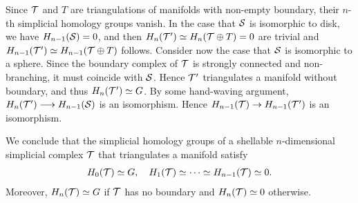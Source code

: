 \documentclass[a4paper]{amsart}
\begin{document}
\begin{remark}
    Since ${\mathcal T}$ and $T$ are triangulations of manifolds with non-empty boundary, their $n$-th simplicial homology groups vanish. 
    In the case that ${\mathcal S}$ is isomorphic to disk, we have $H_{n-1}({\mathcal S}) = 0$,
    and then $H_{n}({\mathcal T}') \simeq H_{n}({\mathcal T} \oplus T) = 0$ are trivial 
    and $H_{n-1}({\mathcal T}') \simeq H_{n-1}({\mathcal T} \oplus T)$ follows.
    Consider now the case that ${\mathcal S}$ is isomorphic to a sphere.
    Since the boundary complex of ${\mathcal T}$ is strongly connected and non-branching, it must coincide with ${\mathcal S}$. Hence ${\mathcal T}'$ triangulates a manifold without boundary, and thus $H_{n}({\mathcal T}') \simeq {G}$. 
    \color{red}By some hand-waving argument, $H_{n}({\mathcal T}') \longrightarrow H_{n-1}({\mathcal S})$ is an isomorphism.\color{black}
    Hence $H_{n-1}({\mathcal T}) \rightarrow H_{n-1}({\mathcal T}')$ is an isomorphism.
    
    We conclude that the simplicial homology groups of a shellable $n$-dimensional simplicial complex ${\mathcal T}$ that triangulates a manifold satisfy 
    \begin{align*}
        H_0({\mathcal T}) \simeq {G}, 
        \quad 
        H_1({\mathcal T}) \simeq \dots \simeq H_{n-1}({\mathcal T}) \simeq 0.
    \end{align*}
    Moreover, $H_n({\mathcal T}) \simeq {G}$ if ${\mathcal T}$ has no boundary and $H_n({\mathcal T}) \simeq 0$ otherwise. 
    
\end{remark}
\end{document}
